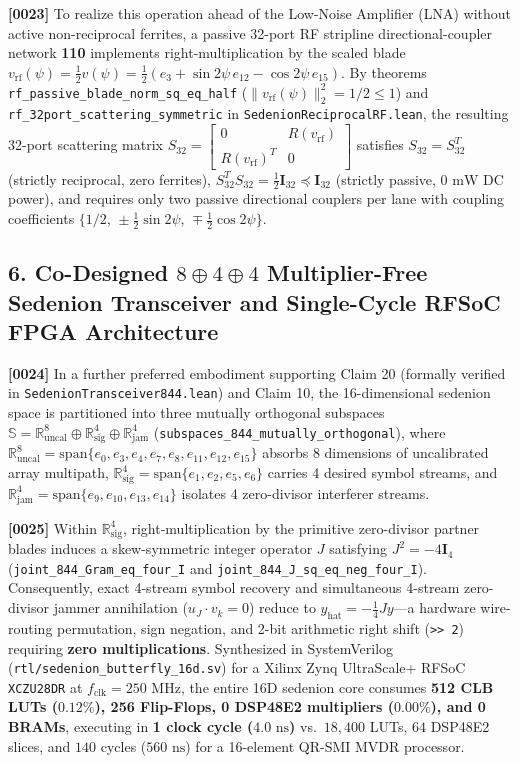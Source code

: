\documentclass[12pt,letterpaper]{article}
\begin{document}
\textbf{[0023]} To realize this operation ahead of the Low-Noise Amplifier (LNA) without active non-reciprocal ferrites, a passive 32-port RF stripline directional-coupler network \textbf{110} implements right-multiplication by the scaled blade $v_{\mathrm{rf}}(\psi) = \frac{1}{2}v(\psi) = \frac{1}{2}(e_3 + \sin 2\psi\,e_{12} - \cos 2\psi\,e_{15})$. By theorems \texttt{rf\_passive\_blade\_norm\_sq\_eq\_half} ($\|v_{\mathrm{rf}}(\psi)\|_2^2 = 1/2 \le 1$) and \texttt{rf\_32port\_scattering\_symmetric} in \texttt{SedenionReciprocalRF.lean}, the resulting 32-port scattering matrix $S_{32} = \begin{bmatrix} 0 & R(v_{\mathrm{rf}}) \\ R(v_{\mathrm{rf}})^T & 0 \end{bmatrix}$ satisfies $S_{32} = S_{32}^T$ (strictly reciprocal, zero ferrites), $S_{32}^T S_{32} = \frac{1}{2}\mathbf{I}_{32} \preceq \mathbf{I}_{32}$ (strictly passive, $0\text{ mW}$ DC power), and requires only two passive directional couplers per lane with coupling coefficients $\{1/2,\, \pm\frac{1}{2}\sin 2\psi,\, \mp\frac{1}{2}\cos 2\psi\}$.

\subsection*{6. Co-Designed $8\oplus 4\oplus 4$ Multiplier-Free Sedenion Transceiver and Single-Cycle RFSoC FPGA Architecture}
\textbf{[0024]} In a further preferred embodiment supporting Claim 20 (formally verified in \texttt{SedenionTransceiver844.lean}) and Claim 10, the 16-dimensional sedenion space is partitioned into three mutually orthogonal subspaces $\mathbb{S} = \mathbb{R}^8_{\mathrm{uncal}} \oplus \mathbb{R}^4_{\mathrm{sig}} \oplus \mathbb{R}^4_{\mathrm{jam}}$ (\texttt{subspaces\_844\_mutually\_orthogonal}), where $\mathbb{R}^8_{\mathrm{uncal}} = \mathrm{span}\{e_0,e_3,e_4,e_7,e_8,e_{11},e_{12},e_{15}\}$ absorbs 8 dimensions of uncalibrated array multipath, $\mathbb{R}^4_{\mathrm{sig}} = \mathrm{span}\{e_1,e_2,e_5,e_6\}$ carries 4 desired symbol streams, and $\mathbb{R}^4_{\mathrm{jam}} = \mathrm{span}\{e_9,e_{10},e_{13},e_{14}\}$ isolates 4 zero-divisor interferer streams.

\textbf{[0025]} Within $\mathbb{R}^4_{\mathrm{sig}}$, right-multiplication by the primitive zero-divisor partner blades induces a skew-symmetric integer operator $J$ satisfying $J^2 = -4\mathbf{I}_4$ (\texttt{joint\_844\_Gram\_eq\_four\_I} and \texttt{joint\_844\_J\_sq\_eq\_neg\_four\_I}). Consequently, exact 4-stream symbol recovery and simultaneous 4-stream zero-divisor jammer annihilation ($u_J \cdot v_k = 0$) reduce to $y_{\mathrm{hat}} = -\frac{1}{4}J y$---a hardware wire-routing permutation, sign negation, and 2-bit arithmetic right shift (\texttt{>> 2}) requiring \textbf{zero multiplications}. Synthesized in SystemVerilog (\texttt{rtl/sedenion\_butterfly\_16d.sv}) for a Xilinx Zynq UltraScale+ RFSoC \texttt{XCZU28DR} at $f_{\mathrm{clk}} = 250\text{ MHz}$, the entire 16D sedenion core consumes \textbf{512 CLB LUTs ($0.12\%$), 256 Flip-Flops, 0 DSP48E2 multipliers ($0.00\%$), and 0 BRAMs}, executing in \textbf{1 clock cycle ($4.0\text{ ns}$)} vs.\ $18{,}400$ LUTs, $64$ DSP48E2 slices, and $140$ cycles ($560\text{ ns}$) for a 16-element QR-SMI MVDR processor.
\end{document}

